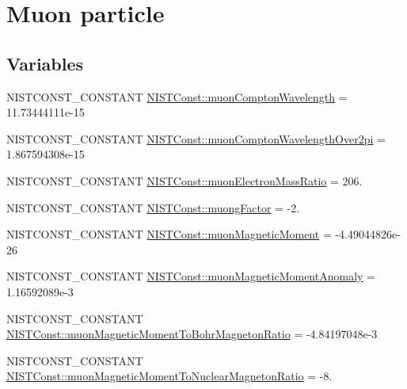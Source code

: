 \hypertarget{group___n_i_s_t_const-_muon}{}\section{Muon particle}
\label{group___n_i_s_t_const-_muon}
\subsection*{Variables}
\begin{DoxyCompactItemize}
\item 
N\+I\+S\+T\+C\+O\+N\+S\+T\+\_\+\+C\+O\+N\+S\+T\+A\+NT \mbox{\hyperlink{group___n_i_s_t_const-_muon_gafa8e9fc422ec4dab36ec7fed34c4b1b0}{N\+I\+S\+T\+Const\+::muon\+Compton\+Wavelength}} = 11.\+73444111e-\/15
\item 
N\+I\+S\+T\+C\+O\+N\+S\+T\+\_\+\+C\+O\+N\+S\+T\+A\+NT \mbox{\hyperlink{group___n_i_s_t_const-_muon_ga7c9ea95beb94545d850a0ffa09c08630}{N\+I\+S\+T\+Const\+::muon\+Compton\+Wavelength\+Over2pi}} = 1.\+867594308e-\/15
\item 
N\+I\+S\+T\+C\+O\+N\+S\+T\+\_\+\+C\+O\+N\+S\+T\+A\+NT \mbox{\hyperlink{group___n_i_s_t_const-_muon_ga66653799cefd4fb005dabc4be673ad74}{N\+I\+S\+T\+Const\+::muon\+Electron\+Mass\+Ratio}} = 206.
\item 
N\+I\+S\+T\+C\+O\+N\+S\+T\+\_\+\+C\+O\+N\+S\+T\+A\+NT \mbox{\hyperlink{group___n_i_s_t_const-_muon_ga2b85305eb64cc099a63d6637b573630d}{N\+I\+S\+T\+Const\+::muong\+Factor}} = -\/2.
\item 
N\+I\+S\+T\+C\+O\+N\+S\+T\+\_\+\+C\+O\+N\+S\+T\+A\+NT \mbox{\hyperlink{group___n_i_s_t_const-_muon_gac11cf134e94f91150434d6a03a615586}{N\+I\+S\+T\+Const\+::muon\+Magnetic\+Moment}} = -\/4.\+49044826e-\/26
\item 
N\+I\+S\+T\+C\+O\+N\+S\+T\+\_\+\+C\+O\+N\+S\+T\+A\+NT \mbox{\hyperlink{group___n_i_s_t_const-_muon_gac35fe5b30f09c6d7601b1435c6ceafdd}{N\+I\+S\+T\+Const\+::muon\+Magnetic\+Moment\+Anomaly}} = 1.\+16592089e-\/3
\item 
N\+I\+S\+T\+C\+O\+N\+S\+T\+\_\+\+C\+O\+N\+S\+T\+A\+NT \mbox{\hyperlink{group___n_i_s_t_const-_muon_gafdfe57fdba97012c3d70a551cdee5486}{N\+I\+S\+T\+Const\+::muon\+Magnetic\+Moment\+To\+Bohr\+Magneton\+Ratio}} = -\/4.\+84197048e-\/3
\item 
N\+I\+S\+T\+C\+O\+N\+S\+T\+\_\+\+C\+O\+N\+S\+T\+A\+NT \mbox{\hyperlink{group___n_i_s_t_const-_muon_gab10139dee865fa4835ccc9d286d95a54}{N\+I\+S\+T\+Const\+::muon\+Magnetic\+Moment\+To\+Nuclear\+Magneton\+Ratio}} = -\/8.

\end{DoxyCompactItemize}
